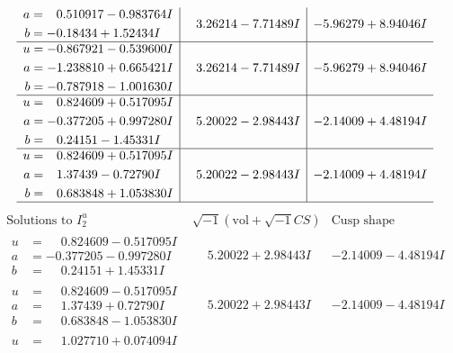 \documentclass[1p]{elsarticle_modified}
\theoremstyle{definition}
\newcommand{\I}{\sqrt{-1}}
\begin{document}
$$\begin{array}{c|c|c}
\begin{aligned}
a &= \phantom{-}0.510917 - 0.983764 I \\
b &= -0.18434 + 1.52434 I\end{aligned}
 & \phantom{-}3.26214 - 7.71489 I & -5.96279 + 8.94046 I \\ \hline\begin{aligned}
u &= -0.867921 - 0.539600 I \\
a &= -1.238810 + 0.665421 I \\
b &= -0.787918 - 1.001630 I\end{aligned}
 & \phantom{-}3.26214 - 7.71489 I & -5.96279 + 8.94046 I \\ \hline\begin{aligned}
u &= \phantom{-}0.824609 + 0.517095 I \\
a &= -0.377205 + 0.997280 I \\
b &= \phantom{-}0.24151 - 1.45331 I\end{aligned}
 & \phantom{-}5.20022 - 2.98443 I & -2.14009 + 4.48194 I \\ \hline\begin{aligned}
u &= \phantom{-}0.824609 + 0.517095 I \\
a &= \phantom{-}1.37439 - 0.72790 I \\
b &= \phantom{-}0.683848 + 1.053830 I\end{aligned}
 & \phantom{-}5.20022 - 2.98443 I & -2.14009 + 4.48194 I\\
 \hline 
 \end{array}$$\newpage$$\begin{array}{c|c|c}  
\text{Solutions to }I^u_{2}& \I (\text{vol} + \sqrt{-1}CS) & \text{Cusp shape}\\
 \hline 
\begin{aligned}
u &= \phantom{-}0.824609 - 0.517095 I \\
a &= -0.377205 - 0.997280 I \\
b &= \phantom{-}0.24151 + 1.45331 I\end{aligned}
 & \phantom{-}5.20022 + 2.98443 I & -2.14009 - 4.48194 I \\ \hline\begin{aligned}
u &= \phantom{-}0.824609 - 0.517095 I \\
a &= \phantom{-}1.37439 + 0.72790 I \\
b &= \phantom{-}0.683848 - 1.053830 I\end{aligned}
 & \phantom{-}5.20022 + 2.98443 I & -2.14009 - 4.48194 I \\ \hline\begin{aligned}
u &= \phantom{-}1.027710 + 0.074094 I \\

\end{aligned}
\end{array}$$
\end{document}
